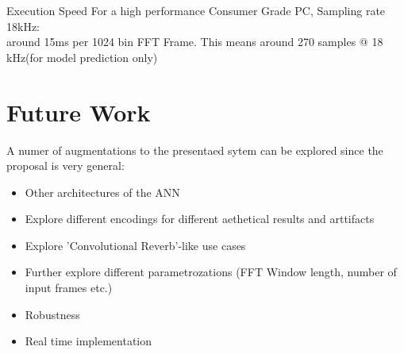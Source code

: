 \documentclass{beamer}
\begin{document}
	\begin{frame}{Execution Speed}
		For a high performance Consumer Grade PC, Sampling rate 18kHz:\\

		around 15ms per 1024 bin FFT Frame. 
		This means around 270 samples @ 18 kHz(for model prediction only)


	\end{frame}









	\section{Future Work}
	\begin{frame}
		A numer of augmentations to the presentaed sytem can be explored since the proposal is very general:
		\begin{itemize}
			\item Other architectures of the ANN
			\item Explore different encodings for different aethetical results and arttifacts
			\item Explore 'Convolutional Reverb'-like use cases
			\item Further explore different parametrozations (FFT Window length, number of input frames etc.)
			\item Robustness
			\item Real time implementation
		\end{itemize}

	\end{frame}
\end{document}
